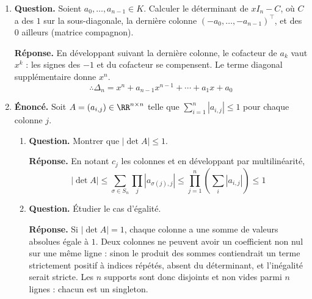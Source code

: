 \documentclass[12pt, a4paper]{article}
\begin{document}
\begin{enumerate}[label=5.\arabic*., start=54]
\begin{minipage}[t]{\linewidth}
\begin{enumerate}[\arabic*.]
  \item \textbf{Question.} Pour $a,b,c\in\RR$, discuter et résoudre $ax+by+cz=1$, $cx+ay+bz=1$, $bx+cy+az=1$.
\par\smallskip
\textbf{Réponse.} Pour $a,b,c\in\RR$, $pq=a^2+b^2+c^2-ab-ac-bc
        =\big((a-b)^2+(a-c)^2+(b-c)^2\big)/2$.

        Si $s=0$, sommer les équations donne $0=3$, donc aucune solution.
        Si $s\neq0$ et $(a,b,c)$ ne sont pas tous égaux, l'unique solution est $(1/s,1/s,1/s)$.
        Si $a=b=c\neq0$, les solutions sont tous les triplets tels que $x+y+z=1/a$.

\end{enumerate}
\end{minipage}

  \item \begin{minipage}[t]{\linewidth}\raggedright
\textbf{Question.} Soient $a_0,\ldots,a_{n-1}\in K$. Calculer le déterminant de $xI_n-C$, où $C$ a des $1$ sur la sous-diagonale, la dernière colonne $(-a_0,\ldots,-a_{n-1})^\top$, et des $0$ ailleurs (matrice compagnon).
\par\smallskip
\textbf{Réponse.} En développant suivant la dernière colonne, le cofacteur de $a_k$ vaut $x^k$ : les signes des $-1$ et du cofacteur se compensent.
    Le terme diagonal supplémentaire donne $x^n$.
    \[
      \therefore\Delta_n=x^n+a_{n-1}x^{n-1}+\cdots+a_1x+a_0
    \]
\end{minipage}

  \item \begin{minipage}[t]{\linewidth}\raggedright
\textbf{Énoncé.} Soit $A=(a_{i,j})\in\RR^{n\times n}$ telle que $\sum_{i=1}^n|a_{i,j}|\leq1$ pour chaque colonne $j$.

\begin{enumerate}[\arabic*.]
        \item \textbf{Question.} Montrer que $|\det A|\leq1$.
\par\smallskip
\textbf{Réponse.} En notant $c_j$ les colonnes et en développant par multilinéarité,
        \[
          |\det A|\leq\sum_{\sigma\in S_n}\prod_j|a_{\sigma(j),j}|
          \leq\prod_{j=1}^n\left(\sum_i|a_{i,j}|\right)\leq1
        \]

  \item \textbf{Question.} Étudier le cas d’égalité.
\par\smallskip
\textbf{Réponse.} Si $|\det A|=1$, chaque colonne a une somme de valeurs absolues égale à $1$.
        Deux colonnes ne peuvent avoir un coefficient non nul sur une même ligne : sinon le produit des sommes contiendrait un terme strictement positif à indices répétés, absent du déterminant, et l'inégalité serait stricte.
        Les $n$ supports sont donc disjoints et non vides parmi $n$ lignes : chacun est un singleton.


\end{enumerate}
\end{minipage}
\end{enumerate}
\end{document}
